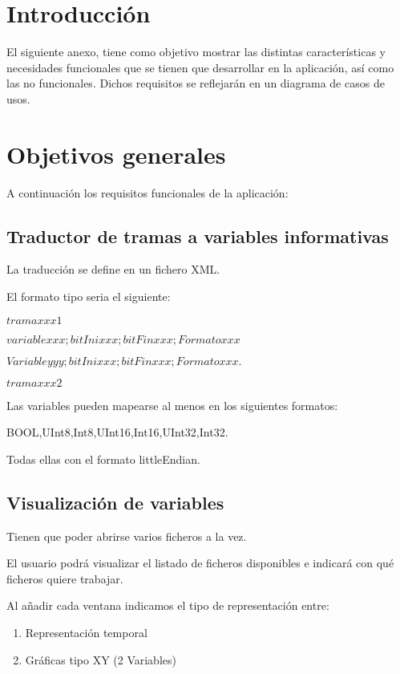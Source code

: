 
\section{Introducción}

El siguiente anexo, tiene como objetivo mostrar las distintas características y necesidades funcionales que se tienen que desarrollar en la aplicación, así como las no funcionales. Dichos requisitos se reflejarán en un diagrama de casos de usos.

\section{Objetivos generales}

A continuación los requisitos funcionales de la aplicación:

\subsection{Traductor de tramas a variables informativas}
La traducción se define en un fichero XML.

El formato tipo seria el siguiente:


$trama xxx1$

$variable xxx; bitIni xxx;bitFin xxx; Formato xxx$

$Variable yyy; bitIni xxx;bitFin xxx; Formato xxx.$

$trama xxx2$

Las variables pueden mapearse al menos en los siguientes formatos:

BOOL,UInt8,Int8,UInt16,Int16,UInt32,Int32. 

Todas ellas con el formato littleEndian.

\subsection{Visualización de variables}
Tienen que poder abrirse varios ficheros a la vez. 

El usuario podrá visualizar el listado de ficheros disponibles e indicará con qué ficheros quiere trabajar.

Al añadir cada ventana indicamos el tipo de representación entre:

\begin{enumerate}
	\item Representación temporal
	\item Gráficas tipo XY (2 Variables)
\end{enumerate}

